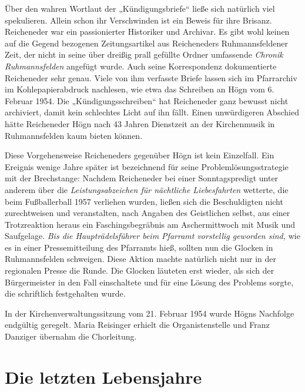 \documentclass{book}
\newcommand{\zitat}[1]{\textit{#1}}
\begin{document}
Über den wahren Wortlaut der „Kündigungsbriefe“ ließe sich natürlich
viel spekulieren. Allein schon ihr Verschwinden ist ein Beweis für ihre
Brisanz. Reicheneder war ein passionierter Historiker und Archivar. Es
gibt wohl keinen auf die Gegend bezogenen Zeitungsartikel aus
Reicheneders Ruh\-mannsfeldener Zeit, der nicht in seine über dreißig
prall gefüllte Ordner um\-fassende \textit{Chronik Ruhmannsfelden}
angefügt wurde. Auch seine Korrespondenz dokumentierte Reicheneder sehr
genau. Viele von ihm verfasste Briefe lassen sich im Pfarrarchiv im
Kohlepapierabdruck nachlesen, wie etwa das Schreiben an Högn vom 6.
Februar 1954. Die „Kündigungsschreiben“ hat Reicheneder ganz bewusst
nicht archiviert, damit kein schlechtes Licht auf ihn fällt. Einen
unwürdigeren Abschied hätte Reicheneder Högn nach 43 Jahren Dienstzeit
an der Kirchenmusik in Ruhmannsfelden kaum bieten können.

Diese Vorgehensweise Reicheneders gegenüber Högn ist kein Einzelfall.
Ein Ereignis wenige Jahre später ist bezeichnend für seine
Problemlösungs\-strategie mit der Brechstange: Nachdem Reicheneder bei
einer Sonntagspre\-digt unter anderem über die
\zitat{Leistungsabzeichen für nächtliche Liebesfahrten}
wetterte, die beim Fußballerball 1957 verliehen wurden, ließen sich die
Beschuldigten nicht zurechtweisen und veranstalten, nach Angaben des
Geistlichen selbst, aus einer Trotzreaktion heraus ein
Faschingsbegräbnis am Aschermittwoch mit Musik und Saufgelage.
\zitat{Bis die Haupträdelsführer beim Pfarramt vorstellig
gewor\-den sind,} wie es in einer Pressemitteilung des Pfarramts hieß,
sollten nun die Glocken in Ruhmannsfelden schweigen. Diese Aktion
machte natürlich nicht nur in der regionalen Presse die Runde. Die
Glocken läuteten erst wieder, als sich der Bürgermeister in den Fall
einschaltete und für eine Lösung des Pro\-blems sorgte, die schriftlich
festgehalten wurde.

In der Kirchenverwaltungssitzung vom 21. Februar 1954 wurde Högns
Nachfolge endgültig geregelt. Maria Reisinger erhielt die
Organistenstelle und Franz Danziger übernahm die Chorleitung.

\section{Die letzten Lebensjahre}
\end{document}
